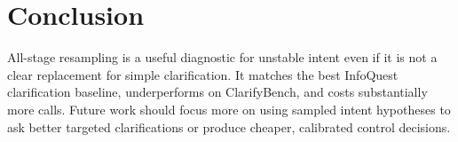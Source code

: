 \section{Conclusion}

All-stage resampling is a useful diagnostic for unstable intent even if it is not a clear replacement for simple clarification. It matches the best InfoQuest clarification baseline, underperforms on ClarifyBench, and costs substantially more calls. Future work should focus more on using sampled intent hypotheses to ask better targeted clarifications or produce cheaper, calibrated control decisions.

